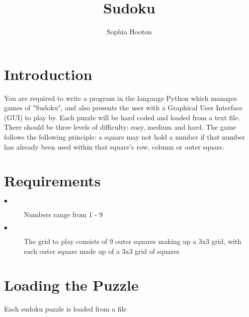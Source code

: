 \documentclass[11pt, oneside]{article}   	%
\title{Sudoku}
\author{Sophia Hooton}
\begin{document}
\maketitle
\section{Introduction}
You are required to write a program in the language Python which manages games of "Sudoku", and also presents the user with a Graphical User Interface (GUI) to play by. Each puzzle will be hard coded and loaded from a text file. There should be three levels of difficulty: easy, medium and hard. The game follows the following principle: a square may not hold a number if that number has already been used within that square's row, column or outer square.

\section{Requirements}
\begin{description}
	\item[$\bullet$] Numbers range from 1 - 9
	\item[$\bullet$] The grid to play consists of 9 outer squares making up a 3x3 grid, with each outer square made up of a 3x3 grid of squares
\end{description}

\section{Loading the Puzzle}
Each sudoku puzzle is loaded from a file


\end{document}
